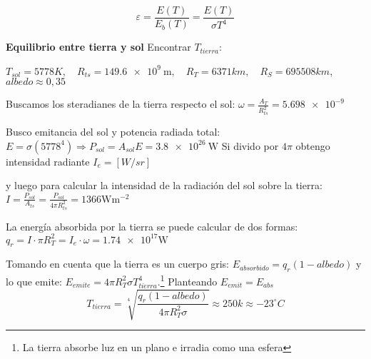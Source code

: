 \[ 
\varepsilon = \frac{E(T)}{E_b(T)} = \frac{E(T)}{\sigma T^4}
\]

{\bf Equilibrio entre tierra y sol} Encontrar $T_{tierra}$:

$T_{sol}=5778K, \quad R_{ts}=\SI{149,6e9}{\meter}, \quad R_T=6371 km,\quad R_S=695508km$, $albedo\approx0,35$

Buscamos los steradianes de la tierra respecto el sol: $\omega=\frac{A_T}{R_{ts}^2}=\num{5,698e-9}$

Busco emitancia del sol y potencia radiada total:
$E=\sigma (5778^4) \Rightarrow P_{sol}=A_{sol}E=\SI{3,8e26}{\watt}$ Si divido por $4\pi$ obtengo intensidad radiante $I_e=[W/sr]$

y luego para calcular la intensidad de la radiación del sol sobre la tierra:
$I=\frac{P_{sol}}{A_{ts}}=\frac{P_{sol}}{4\pi R_{ts}^2}=1366\si{\watt \meter^{-2}}$

La energía absorbida por la tierra se puede calcular de dos formas:
$q_r=I\cdot \pi R_T^2=I_e\cdot \omega=\num{1,74e17}\si{\watt} $

Tomando en cuenta que la tierra es un cuerpo gris: 
$E_{absorbido}=q_r(1-albedo)$ y lo que emite: $E_{emite}=4\pi R_T^2 \sigma T_{tierra}^4$.\footnote{La tierra absorbe luz en un plano e irradia como una esfera} Planteando $E_{emit}=E_{abs}$
\[ T_{tierra} = \sqrt[4]{\frac{q_r(1-albedo)}{4\pi R_T^2 \sigma}}\approx 250k \approx -23^\circ C\]

